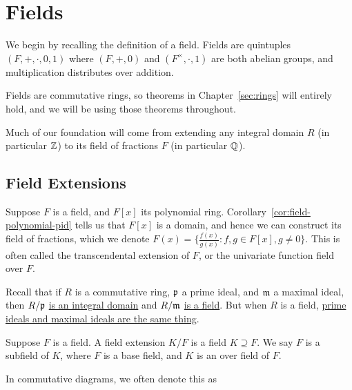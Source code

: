 \chapter{Fields}

\begin{remark}
    We begin by recalling the definition of a field.
    Fields are quintuples \((F,+,\cdot,0,1)\) where
    \((F,+,0)\) and \((F^\times,\cdot,1)\) are both abelian groups,
    and multiplication distributes over addition.
\end{remark}
\begin{remark}
    Fields are commutative rings,
    so theorems in Chapter~\ref{sec:rings} will entirely hold,
    and we will be using those theorems throughout.
\end{remark}
\begin{remark}
    Much of our foundation will come from extending any integral domain \(R\)
    (in particular \(\mathbb{Z}\))
    to its field of fractions \(F\) (in particular \(\mathbb{Q}\)).
\end{remark}


\section{Field Extensions}

\begin{definition}
    Suppose \(F\) is a field, and \(F[x]\) its polynomial ring.
    Corollary~\ref{cor:field-polynomial-pid} tells us that
    \(F[x]\) is a domain,
    and hence we can construct its field of fractions,
    which we denote \(F(x) = \{\frac{f(x)}{g(x)} : f,g \in F[x], g \neq 0\}\).
    This is often called the transcendental extension of \(F\),
    or the univariate function field over \(F\).
\end{definition}

\begin{remark}
    Recall that if \(R\) is a commutative ring,
    \(\mathfrak{p}\) a prime ideal, and \(\mathfrak{m}\) a maximal ideal,
    then \(R/\mathfrak{p}\) \hyperref[thm:prime-quotient-domain]{is an integral domain}
    and \(R/\mathfrak{m}\) \hyperref[thm:maximal-quotient-field]{is a field}.
    But when \(R\) is a field,
    \hyperref[prop:pid-maximal-is-prime]{prime ideals and maximal ideals are the same thing}.
\end{remark}

\begin{definition}
    Suppose \(F\) is a field.
    A field extension \(K/F\) is a field \(K \supseteq F\).
    We say \(F\) is a subfield of \(K\),
    where \(F\) is a base field, and \(K\) is an over field of \(F\).

    In commutative diagrams, we often denote this as
    \begin{center}
    \end{center}
\end{definition}

